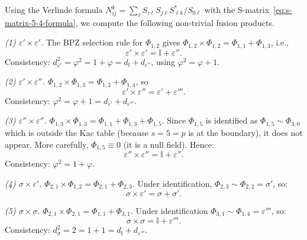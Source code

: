 \begin{computation}\label{comp:fusion-5-4}
Using the Verlinde formula
$N_{ij}^k = \sum_{\ell} S_{i\ell}S_{j\ell}S_{\ell k}^*/S_{0\ell}$
with the S-matrix~\eqref{eq:s-matrix-5-4-formula}, we compute the following
non-trivial fusion products.

\emph{(1) $\varepsilon' \times \varepsilon'$.}
The BPZ selection rule \cite{BPZ84} for $\Phi_{1,2}$ gives
$\Phi_{1,2}\times\Phi_{1,2} = \Phi_{1,1} + \Phi_{1,3}$, i.e.,
\begin{equation}\label{eq:fusion-5-4-eps-eps}
\varepsilon' \times \varepsilon' = \mathbb{I} + \varepsilon''.
\end{equation}
Consistency: $d_{\varepsilon'}^2 = \varphi^2 = 1 + \varphi = d_{\mathbb{I}} + d_{\varepsilon''}$,
using $\varphi^2 = \varphi + 1$.

\emph{(2) $\varepsilon' \times \varepsilon''$.}
$\Phi_{1,2}\times\Phi_{1,3} = \Phi_{1,2} + \Phi_{1,4}$, so
\begin{equation}\label{eq:fusion-5-4-eps-epspp}
\varepsilon' \times \varepsilon'' = \varepsilon' + \varepsilon'''.
\end{equation}
Consistency: $\varphi^2 = \varphi + 1 = d_{\varepsilon'} + d_{\varepsilon'''}$.

\emph{(3) $\varepsilon'' \times \varepsilon''$.}
$\Phi_{1,3}\times\Phi_{1,3} = \Phi_{1,1} + \Phi_{1,3} + \Phi_{1,5}$.
Since $\Phi_{1,5}$ is identified as $\Phi_{1,5} \sim \Phi_{3,0}$ which is
outside the Kac table (because $s=5 = p$ is at the boundary), it does not appear.
More carefully, $\Phi_{1,5} \equiv 0$ (it is a null field).  Hence:
\begin{equation}\label{eq:fusion-5-4-epspp-epspp}
\varepsilon'' \times \varepsilon'' = \mathbb{I} + \varepsilon''.
\end{equation}
Consistency: $\varphi^2 = 1 + \varphi$.

\emph{(4) $\sigma \times \varepsilon'$.}
$\Phi_{2,1}\times\Phi_{1,2} = \Phi_{2,1} + \Phi_{2,3}$.  Under identification,
$\Phi_{2,3} \sim \Phi_{2,2} = \sigma'$, so:
\begin{equation}\label{eq:fusion-5-4-sig-eps}
\sigma \times \varepsilon' = \sigma + \sigma'.
\end{equation}

\emph{(5) $\sigma \times \sigma$.}
$\Phi_{2,1}\times\Phi_{2,1} = \Phi_{1,1} + \Phi_{3,1}$.  Under identification
$\Phi_{3,1} \sim \Phi_{1,4} = \varepsilon'''$, so:
\begin{equation}\label{eq:fusion-5-4-sig-sig}
\sigma \times \sigma = \mathbb{I} + \varepsilon'''.
\end{equation}
Consistency: $d_\sigma^2 = 2 = 1 + 1 = d_{\mathbb{I}} + d_{\varepsilon'''}$.


\end{computation}
